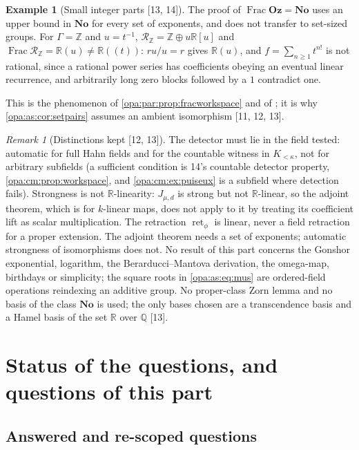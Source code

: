 \documentclass[11pt,oneside]{article}
\numberwithin{equation}{section}
\theoremstyle{definition}
\newtheorem{example}[example]{Example}
\theoremstyle{remark}
\newtheorem{remark}[remark]{Remark}
\newcommand{\No}{\mathbf{No}}
\newcommand{\Oz}{\mathbf{Oz}}
\newcommand{\R}{\mathbb R}
\newcommand{\Q}{\mathbb Q}
\newcommand{\Z}{\mathbb Z}
\newcommand{\Frac}{\operatorname{Frac}}
\newcommand{\src}[1]{\textup{\textsf{\small[#1]}}}
\newcommand{\ret}{\operatorname{ret}}
\begin{document}
\begin{example}[Small integer parts \src{13, 14}]\label{opa:as:ex:smallfrac}
The proof of $\Frac\Oz=\No$ uses an upper bound in $\No$ for every set of exponents, and does not transfer to set-sized
groups. For $\Gamma=\Z$ and $u=t^{-1}$, $\mathcal R_\Z=\Z\oplus u\R[u]$ and $\Frac\mathcal R_\Z=\R(u)\ne\R((t))$:
$ru/u=r$ gives $\R(u)$, and $f=\sum_{n\ge1}t^{n!}$ is not rational, since a rational power series has coefficients
obeying an eventual linear recurrence, and arbitrarily long zero blocks followed by a $1$ contradict one.
\end{example}

This is the phenomenon of \cref{opa:par:prop:fracworkspace} and of \cite[Proposition 2.4.5]{LM}; it is why
\cref{opa:as:cor:setpairs} assumes an ambient isomorphism \src{11, 12, 13}.

\begin{remark}[Distinctions kept \src{12, 13}]\label{opa:as:rem:checklist}
The detector must lie in the field tested: automatic for full Hahn fields and for the countable witness in
$K_{<\kappa}$, not for arbitrary subfields (a sufficient condition is 14's countable detector property,
\cref{opa:cm:prop:workspace}, and \cref{opa:cm:ex:puiseux} is a subfield where detection fails). Strongness is not $\R$-linearity: $J_{\mu,d}$ is strong but not
$\R$-linear, so the adjoint theorem, which is for $k$-linear maps, does not apply to it by treating its coefficient lift
as scalar multiplication. The retraction $\ret_\phi$ is linear, never a field retraction for a proper extension. The
adjoint theorem needs a set of exponents; automatic strongness of isomorphisms does not. No result of this part concerns
the Gonshor exponential, logarithm, the Berarducci--Mantova derivation, the omega-map, birthdays or simplicity; the
square roots in \eqref{opa:as:eq:mus} are ordered-field operations reindexing an additive group. No proper-class Zorn
lemma and no basis of the class $\No$ is used; the only bases chosen are a transcendence basis and a Hamel basis of the
set $\R$ over $\Q$ \src{13}.
\end{remark}

\section{Status of the questions, and questions of this part}\label{opa:as:sec:questions}

\subsection{Answered and re-scoped questions}\label{opa:as:sub:status}
\end{document}
